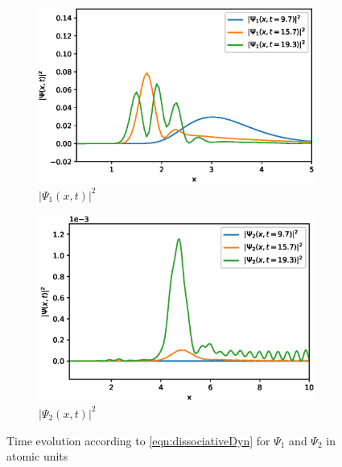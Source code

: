 \documentclass[12pt]{article}
\begin{document}
\begin{figure}
	\centering
	\begin{subfigure}{0.485\textwidth} %
		\includegraphics[width=\textwidth]{withIR_1.eps}
		\caption{$|\Psi_1(x,t)|^2$} %
	\end{subfigure}
	\begin{subfigure}{0.485\textwidth} %
		\includegraphics[width=\textwidth]{withIR_2.eps}
		\caption{$|\Psi_2(x,t)|^2$} %
	\end{subfigure}
	\caption{Time evolution according to \eqref{eqn:dissociativeDyn} for $\Psi_1$ and $\Psi_2$ in atomic units} 
\end{figure}



\end{document}
